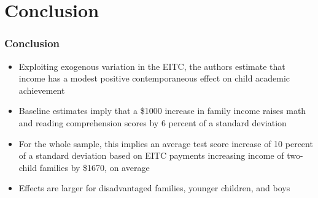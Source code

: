 \documentclass{beamer}
\begin{document}
\section{Conclusion}


\begin{frame}
\frametitle{Conclusion}
\begin{itemize}
	\item Exploiting exogenous variation in the EITC, the authors estimate that income has a modest positive contemporaneous effect on child academic achievement
	\item Baseline estimates imply that a \$1000 increase in family income raises math and reading comprehension scores by 6 percent of a standard deviation
	\item For the whole sample, this implies an average test score increase of 10 percent of a standard deviation based on EITC payments increasing income of two-child families by \$1670, on average
	\item Effects are larger for disadvantaged families, younger children, and boys 
\end{itemize}
\end{frame}



\iffalse
	\begin{columns}
		\column{0.5\textwidth}
		\centering
		\column{0.5\textwidth}
		\centering
	\end{columns}
\fi
\end{document}

